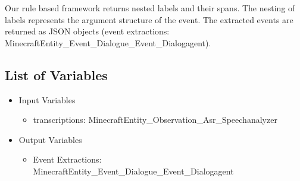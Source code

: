 Our rule based framework returns nested labels and their spans. The nesting of labels represents the argument structure of the event. The extracted events are returned as JSON objects (event extractions: MinecraftEntity\_Event\_Dialogue\_Event\_Dialogagent). 


\subsection{List of Variables}
\begin{itemize}
    \item Input Variables
    \begin{itemize}
        \item transcriptions: MinecraftEntity\_Observation\_Asr\_Speechanalyzer
    \end{itemize}
    \item Output Variables
    \begin{itemize}
        \item Event Extractions: MinecraftEntity\_Event\_Dialogue\_Event\_Dialogagent
    \end{itemize}
\end{itemize}



